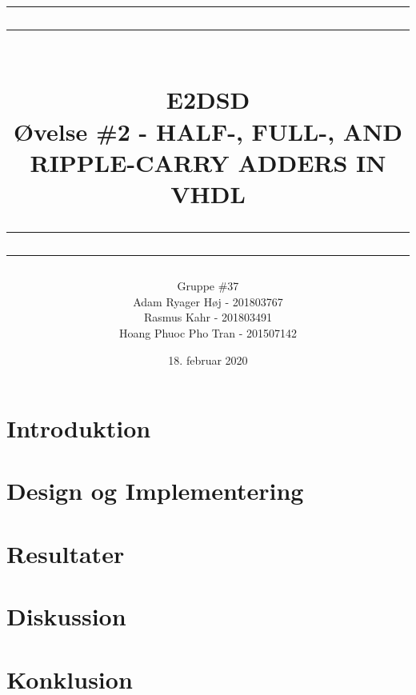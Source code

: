 \documentclass[12pt,a4paper]{article}
\newcommand\mymaketitle[1]{
   \rule{\textwidth}{1.6pt}\vspace*{-\baselineskip}\vspace*{2pt}
   \rule{\textwidth}{0.4pt}
   \\   
   \huge \bf #1\\
   \vspace{-8pt}
   \rule{\textwidth}{0.4pt}\vspace*{-\baselineskip}\vspace{3.2pt}
   \rule{\textwidth}{1.6pt}
}
\begin{document}
\title{
	\mymaketitle{E2DSD\\Øvelse \#2 - HALF-, FULL-, AND RIPPLE-CARRY ADDERS IN VHDL}
}
\author{
	Gruppe \#37\\
	Adam Ryager Høj - 201803767\\
   Rasmus Kahr - 201803491\\
   Hoang Phuoc Pho Tran - 201507142
}
\date{18. februar 2020}

\maketitle

\section{Introduktion}


\section{Design og Implementering}


\section{Resultater}


\section{Diskussion}


\section{Konklusion}

\end{document}
